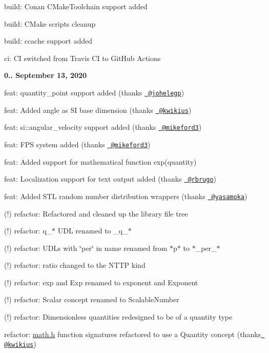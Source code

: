 \begin{DoxyItemize}
\begin{DoxyItemize}
\item build\+: Conan CMake\+Toolchain support added
\item build\+: CMake scripts cleanup
\item build\+: ccache support added
\item ci\+: CI switched from Travis CI to Git\+Hub Actions
\end{DoxyItemize}
\item {\bfseries{0.. September 13, 2020}}
\begin{DoxyItemize}
\item feat\+: {\ttfamily quantity\+\_\+point} support added (thanks \href{https://github.com/johelegp}{\texttt{ @johelegp}})
\item feat\+: Added angle as SI base dimension (thanks \href{https://github.com/kwikius}{\texttt{ @kwikius}})
\item feat\+: {\ttfamily si\+::angular\+\_\+velocity} support added (thanks \href{https://github.com/mikeford3}{\texttt{ @mikeford3}})
\item feat\+: FPS system added (thanks \href{https://github.com/mikeford3}{\texttt{ @mikeford3}})
\item feat\+: Added support for mathematical function {\ttfamily exp(quantity)}
\item feat\+: Localization support for text output added (thanks \href{https://github.com/rbrugo}{\texttt{ @rbrugo}})
\item feat\+: Added STL random number distribution wrappers (thanks \href{https://github.com/yasamoka}{\texttt{ @yasamoka}})
\item (!) refactor\+: Refactored and cleaned up the library file tree
\item (!) refactor\+: {\ttfamily q\+\_\+$\ast$} UDL renamed to {\ttfamily \+\_\+q\+\_\+$\ast$}
\item (!) refactor\+: UDLs with \char`\"{}per\char`\"{} in name renamed from {\ttfamily $\ast$p$\ast$} to {\ttfamily $\ast$\+\_\+per\+\_\+$\ast$}
\item (!) refactor\+: {\ttfamily ratio} changed to the NTTP kind
\item (!) refactor\+: {\ttfamily exp} and {\ttfamily Exp} renamed to {\ttfamily exponent} and {\ttfamily Exponent}
\item (!) refactor\+: {\ttfamily Scalar} concept renamed to {\ttfamily Scalable\+Number}
\item (!) refactor\+: Dimensionless quantities redesigned to be of a {\ttfamily quantity} type
\item refactor\+: {\ttfamily \mbox{\hyperlink{math_8h_source}{math.\+h}}} function signatures refactored to use a {\ttfamily Quantity} concept (thanks \href{https://github.com/kwikius}{\texttt{ @kwikius}})

\end{DoxyItemize}
\end{DoxyItemize}
